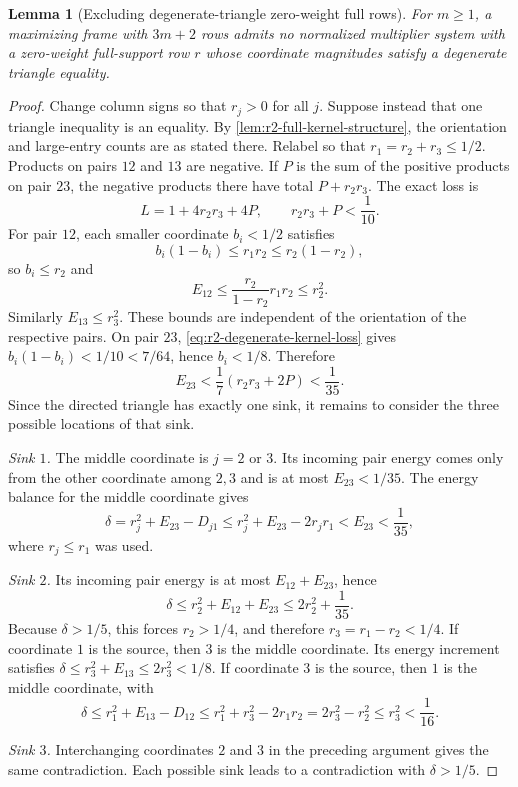 \documentclass[11pt]{article}
\numberwithin{equation}{section}
\newtheorem{lemma}[lemma]{Lemma}
\theoremstyle{definition}
\theoremstyle{definition}
\begin{document}
\begin{lemma}[Excluding degenerate-triangle zero-weight full rows]
\label{lem:r2-degenerate-triangle}
For $m\ge1$, a maximizing frame with $3m+2$ rows admits no normalized
multiplier system with a zero-weight full-support row $r$ whose
coordinate magnitudes satisfy a degenerate triangle equality.
\end{lemma}
\begin{proof}
Change column signs so that $r_j>0$ for all $j$.
Suppose instead that one triangle inequality is an equality.
By \cref{lem:r2-full-kernel-structure}, the orientation and
large-entry counts are as stated there. Relabel so that
$r_1=r_2+r_3\le1/2$. Products on pairs $12$ and $13$ are
negative. If $P$ is the sum of the positive products on pair
$23$, the negative products there have total $P+r_2r_3$.
The exact loss is
\begin{equation}
 L=1+4r_2r_3+4P,
 \qquad r_2r_3+P<\frac1{10}.
 \label{eq:r2-degenerate-kernel-loss}
\end{equation}
For pair $12$, each smaller coordinate $b_i<1/2$ satisfies
\[
 b_i(1-b_i)\le r_1r_2\le r_2(1-r_2),
\]
so $b_i\le r_2$ and
\[
 E_{12}\le\frac{r_2}{1-r_2}r_1r_2\le r_2^2.
\]
Similarly $E_{13}\le r_3^2$. These bounds are independent of
the orientation of the respective pairs.
On pair $23$, \eqref{eq:r2-degenerate-kernel-loss} gives
$b_i(1-b_i)<1/10<7/64$, hence $b_i<1/8$. Therefore
\begin{equation}
 E_{23}<\frac17(r_2r_3+2P)<\frac1{35}.
 \label{eq:r2-small-cross-edge}
\end{equation}
Since the directed triangle has exactly one sink, it remains to
consider the three possible locations of that sink.

\emph{Sink $1$.}  The middle coordinate is $j=2$ or $3$.
Its incoming pair energy comes only from the other coordinate among
$2,3$ and is at most $E_{23}<1/35$.  The energy balance for the
middle coordinate gives
\[
 \delta=r_j^2+E_{23}-D_{j1}
 \le r_j^2+E_{23}-2r_jr_1<E_{23}<\frac1{35},
\]
where $r_j\le r_1$ was used.

\emph{Sink $2$.}  Its incoming pair energy is at most
$E_{12}+E_{23}$, hence
\[
 \delta\le r_2^2+E_{12}+E_{23}
 \le2r_2^2+\frac1{35}.
\]
Because $\delta>1/5$, this forces $r_2>1/4$, and therefore
$r_3=r_1-r_2<1/4$.
If coordinate $1$ is the source, then $3$ is the middle coordinate.
Its energy increment satisfies
$\delta\le r_3^2+E_{13}\le2r_3^2<1/8$.
If coordinate $3$ is the source, then $1$ is the middle coordinate,
with
\[
 \delta\le r_1^2+E_{13}-D_{12}
 \le r_1^2+r_3^2-2r_1r_2
 =2r_3^2-r_2^2\le r_3^2<\frac1{16}.
\]

\emph{Sink $3$.}  Interchanging coordinates $2$ and $3$ in the
preceding argument gives the same contradiction.
Each possible sink leads to a contradiction with $\delta>1/5$.
\end{proof}
\end{document}
